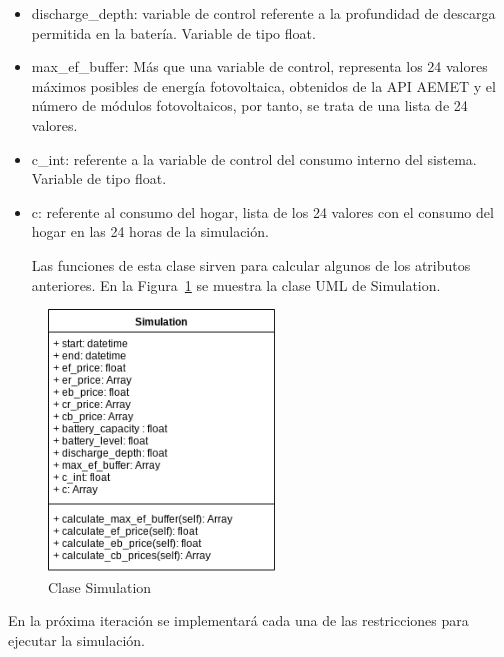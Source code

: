 \begin{itemize}
        \item discharge\_depth: variable de control referente a la profundidad de descarga permitida en la batería. Variable de tipo float.
        \item max\_ef\_buffer: Más que una variable de control, representa los 24 valores máximos posibles de energía fotovoltaica, obtenidos de la API AEMET y el número de módulos fotovoltaicos, por tanto, se trata de una lista de 24 valores.
        \item c\_int: referente a la variable de control del consumo interno del sistema. Variable de tipo float.
        \item c: referente al consumo del hogar, lista de los 24 valores con el consumo del hogar en las 24 horas de la simulación.

Las funciones de esta clase sirven para calcular algunos de los atributos anteriores. En la Figura~\ref{fig:simulation} se muestra la clase UML de Simulation.
\end{itemize}

\begin{figure}[H]
        \centering
        \includegraphics[width=6cm]{figs/simulation_class.png}
        \caption{Clase Simulation}
        \label{fig:simulation}
\end{figure}

En la próxima iteración se implementará cada una de las restricciones para ejecutar la simulación.
